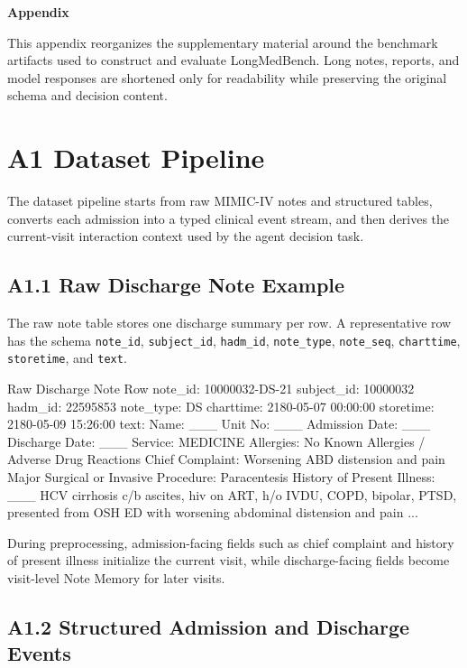 \centerline{\xiaoyi\bf Appendix}

This appendix reorganizes the supplementary material around the benchmark artifacts used to construct and evaluate LongMedBench.  Long notes, reports, and model responses are shortened only for readability while preserving the original schema and decision content.

\section*{A1 Dataset Pipeline}

The dataset pipeline starts from raw MIMIC-IV notes and structured tables, converts each admission into a typed clinical event stream, and then derives the current-visit interaction context used by the agent decision task. 

\subsection*{A1.1 Raw Discharge Note Example}

The raw note table stores one discharge summary per row. A representative row has the schema \texttt{note\_id}, \texttt{subject\_id}, \texttt{hadm\_id}, \texttt{note\_type}, \texttt{note\_seq}, \texttt{charttime}, \texttt{storetime}, and \texttt{text}.

\begin{promptblock}{Raw Discharge Note Row}
note_id: 10000032-DS-21
subject_id: 10000032
hadm_id: 22595853
note_type: DS
charttime: 2180-05-07 00:00:00
storetime: 2180-05-09 15:26:00
text: Name: ___  Unit No: ___
Admission Date: ___  Discharge Date: ___
Service: MEDICINE
Allergies: No Known Allergies / Adverse Drug Reactions
Chief Complaint: Worsening ABD distension and pain
Major Surgical or Invasive Procedure: Paracentesis
History of Present Illness: ___ HCV cirrhosis c/b ascites,
hiv on ART, h/o IVDU, COPD, bipolar, PTSD, presented from OSH ED
with worsening abdominal distension and pain ...
\end{promptblock}

During preprocessing, admission-facing fields such as chief complaint and history of present illness initialize the current visit, while discharge-facing fields become visit-level Note Memory for later visits.

\subsection*{A1.2 Structured Admission and Discharge Events}

